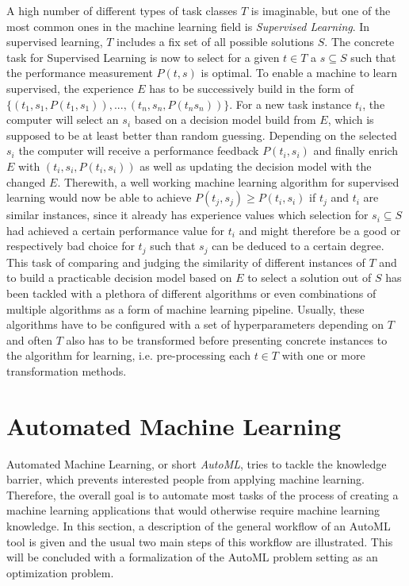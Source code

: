A high number of different types of task classes $T$ is imaginable, but one of the most common ones in the machine learning field is \textit{Supervised Learning}.
In supervised learning, $T$ includes a fix set of all possible solutions $S$.
The concrete task for Supervised Learning is now to select for a given $t\in T$ a $s\subseteq S$ such that the performance measurement $P(t,s)$ is optimal.
To enable a machine to learn supervised, the experience $E$ has to be successively build in the form of $\{(t_1, s_1, P(t_1, s_1)), ..., (t_n, s_n, P(t_n s_n))\}$.\newline
For a new task instance $t_i$, the computer will select an $s_i$ based on a decision model build from $E$, which is supposed to be at least better than random guessing.
Depending on the selected $s_i$ the computer will receive a performance feedback $P(t_i, s_i)$ and finally enrich $E$ with $(t_i, s_i, P(t_i, s_i))$ as well as updating the decision model with the changed $E$.
Therewith, a well working machine learning algorithm for supervised learning would now be able to achieve $P(t_j, s_j) \geq P(t_i, s_i)$ if $t_j$ and $t_i$ are similar instances, since it already has experience values which selection for $s_i\subseteq S$ had achieved a certain performance value for $t_i$ and might therefore be a good or respectively bad choice for $t_j$ such that $s_j$ can be deduced to a certain degree.\newline
This task of comparing and judging the similarity of different instances of $T$ and to build a practicable decision model based on $E$ to select a solution out of $S$ has been tackled with a plethora of different algorithms or even combinations of multiple algorithms as a form of machine learning pipeline.
Usually, these algorithms have to be configured with a set of hyperparameters depending on $T$ and often $T$ also has to be transformed before presenting concrete instances to the algorithm for learning, i.e. pre-processing each $t\in T$ with one or more transformation methods.\newline

\section{Automated Machine Learning}
\label{sec:theory:automl}
Automated Machine Learning, or short \textit{AutoML}, tries to tackle the knowledge barrier, which prevents interested people from applying machine learning.
Therefore, the overall goal is to automate most tasks of the process of creating a machine learning applications that would otherwise require machine learning knowledge.\newline
In this section, a description of the general workflow of an AutoML tool is given and the usual two main steps of this workflow are illustrated.
This will be concluded with a formalization of the AutoML problem setting as an optimization problem.

